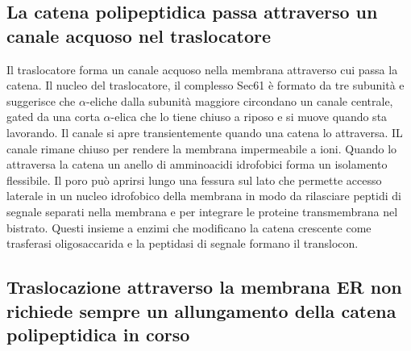 \subsection{La catena polipeptidica passa attraverso un canale acquoso nel traslocatore}
Il traslocatore forma un canale acquoso nella membrana attraverso cui passa la catena. Il nucleo del traslocatore, il complesso Sec61 \`e formato da tre subunit\`a e suggerisce che 
$\alpha$-eliche dalla subunit\`a maggiore circondano un canale centrale, gated da una corta $\alpha$-elica che lo tiene chiuso a riposo e si muove quando sta lavorando. Il canale si
apre transientemente quando una catena lo attraversa. IL canale rimane chiuso per rendere la membrana impermeabile a ioni. Quando lo attraversa la catena un anello di amminoacidi 
idrofobici forma un isolamento flessibile. Il poro pu\`o aprirsi lungo una fessura sul lato che permette accesso laterale in un nucleo idrofobico della membrana in modo 
da rilasciare peptidi di segnale separati nella membrana e per integrare le proteine transmembrana nel bistrato. Questi insieme a enzimi che modificano la catena crescente come
trasferasi oligosaccarida e la peptidasi di segnale formano il translocon.
\subsection{Traslocazione attraverso la membrana ER non richiede sempre un allungamento della catena polipeptidica in corso}
